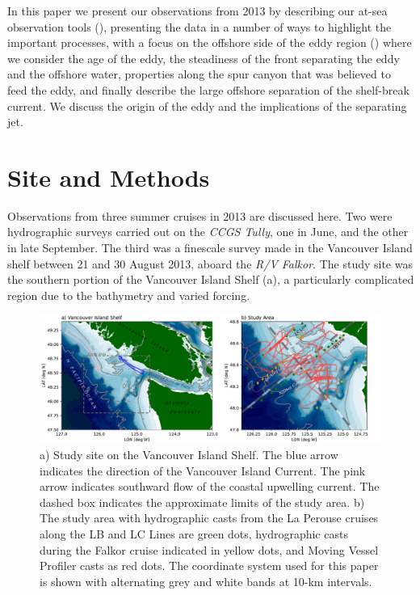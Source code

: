 \documentclass[draft]{agujournal2019}
\begin{document}
In this paper we present our observations from 2013 by describing our at-sea observation tools (), presenting the data in a number of ways to highlight the important processes, with a focus on the offshore side of the eddy region () where we consider the age of the eddy, the steadiness of the front separating the eddy and the offshore water, properties along the spur canyon that was believed to feed the eddy, and finally describe the large offshore separation of the shelf-break current.  We discuss the origin of the eddy and the implications of the separating jet.

\section{Site and Methods}
\label{sec:Site}

Observations from three summer cruises in 2013 are discussed here. Two were hydrographic surveys carried out on the \emph{CCGS Tully}, one in June, and the other in late September.  The third was a finescale survey made in the Vancouver Island shelf between 21 and 30 August 2013, aboard the \emph{R/V Falkor}.  The study site was the southern portion of the Vancouver Island Shelf (a), a particularly complicated region due to the bathymetry and varied forcing.

\begin{figure}[htbp]
  \includegraphics[width=5in]{LocMapBoth.pdf}
  \caption{a) Study site on the Vancouver Island Shelf.  The blue arrow indicates the direction of the Vancouver Island Current.  The pink arrow indicates southward flow of the coastal upwelling current.  The dashed box indicates the approximate limits of the study area.  b) The study area with hydrographic casts from the La Perouse cruises along the LB and LC Lines are green dots, hydrographic casts during the Falkor cruise indicated in yellow dots, and Moving Vessel Profiler casts as red dots.  The coordinate system used for this paper is shown with alternating grey and white bands at 10-km intervals.}
  \label{fig:LocMapBoth}
\end{figure}
\end{document}
